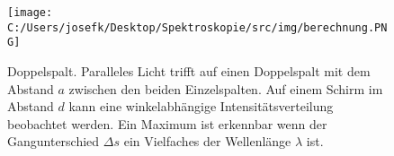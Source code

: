 \begin{figure}[H]
    \texttt{[image: C:/Users/josefk/Desktop/Spektroskopie/src/img/berechnung.PNG]}
    \caption{Doppelspalt. Paralleles Licht trifft auf einen
    Doppelspalt mit dem Abstand $a$ zwischen den beiden Einzelspalten.
    Auf einem Schirm im Abstand $d$ kann eine winkelabhängige
    Intensitätsverteilung beobachtet werden. Ein Maximum ist erkennbar
    wenn der Gangunterschied $\Delta s$ ein Vielfaches der Wellenlänge $\lambda$ ist.}
\end{figure}
